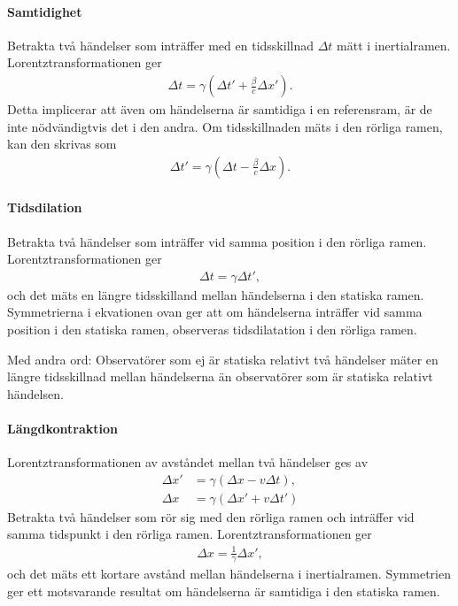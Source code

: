 \paragraph{Samtidighet}
Betrakta två händelser som inträffer med en tidsskillnad $\Delta t$ mätt i inertialramen. Lorentztransformationen ger
\begin{align*}
	\Delta t = \gamma(\Delta t' + \frac{\beta}{c}\Delta x').
\end{align*}
Detta implicerar att även om händelserna är samtidiga i en referensram, är de inte nödvändigtvis det i den andra. Om tidsskillnaden mäts i den rörliga ramen, kan den skrivas som
\begin{align*}
	\Delta t' = \gamma(\Delta t - \frac{\beta}{c}\Delta x).
\end{align*}

\paragraph{Tidsdilation}
Betrakta två händelser som inträffer vid samma position i den rörliga ramen. Lorentztransformationen ger
\begin{align*}
	\Delta t = \gamma\Delta t',
\end{align*}
och det mäts en längre tidsskilland mellan händelserna i den statiska ramen. Symmetrierna i ekvationen ovan ger att om händelserna inträffer vid samma position i den statiska ramen, observeras tidsdilatation i den rörliga ramen.

Med andra ord: Observatörer som ej är statiska relativt två händelser mäter en längre tidsskillnad mellan händelserna än observatörer som är statiska relativt händelsen.

\paragraph{Längdkontraktion}
Lorentztransformationen av avståndet mellan två händelser ges av
\begin{align*}
	\Delta x' &= \gamma(\Delta x - v\Delta t), \\
	\Delta x  &= \gamma(\Delta x' + v\Delta t')
\end{align*}
Betrakta två händelser som rör sig med den rörliga ramen och inträffer vid samma tidspunkt i den rörliga ramen. Lorentztransformationen ger
\begin{align*}
	\Delta x = \frac{1}{\gamma}\Delta x',
\end{align*}
och det mäts ett kortare avstånd mellan händelserna i inertialramen. Symmetrien ger ett motsvarande resultat om händelserna är samtidiga i den statiska ramen.

